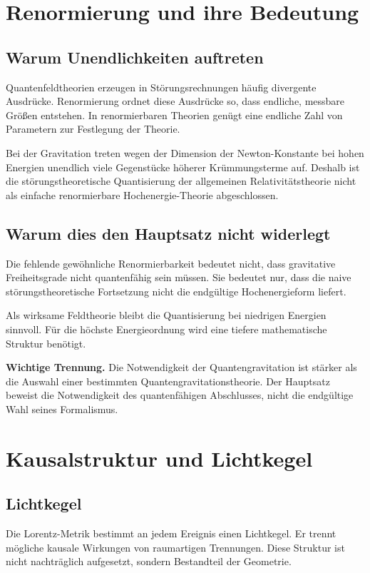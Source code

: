 \documentclass[11pt,a4paper,openany]{book}
\theoremstyle{remark}
\begin{document}
\chapter{Renormierung und ihre Bedeutung}
\section{Warum Unendlichkeiten auftreten}
Quantenfeldtheorien erzeugen in Störungsrechnungen häufig divergente Ausdrücke. Renormierung ordnet diese Ausdrücke so, dass endliche, messbare Größen entstehen. In renormierbaren Theorien genügt eine endliche Zahl von Parametern zur Festlegung der Theorie.

Bei der Gravitation treten wegen der Dimension der Newton-Konstante bei hohen Energien unendlich viele Gegenstücke höherer Krümmungsterme auf. Deshalb ist die störungstheoretische Quantisierung der allgemeinen Relativitätstheorie nicht als einfache renormierbare Hochenergie-Theorie abgeschlossen.

\section{Warum dies den Hauptsatz nicht widerlegt}
Die fehlende gewöhnliche Renormierbarkeit bedeutet nicht, dass gravitative Freiheitsgrade nicht quantenfähig sein müssen. Sie bedeutet nur, dass die naive störungstheoretische Fortsetzung nicht die endgültige Hochenergieform liefert.

Als wirksame Feldtheorie bleibt die Quantisierung bei niedrigen Energien sinnvoll. Für die höchste Energieordnung wird eine tiefere mathematische Struktur benötigt.

\begin{merkkasten}
\textbf{Wichtige Trennung.} Die Notwendigkeit der Quantengravitation ist stärker als die Auswahl einer bestimmten Quantengravitationstheorie. Der Hauptsatz beweist die Notwendigkeit des quantenfähigen Abschlusses, nicht die endgültige Wahl seines Formalismus.
\end{merkkasten}

\chapter{Kausalstruktur und Lichtkegel}
\section{Lichtkegel}
Die Lorentz-Metrik bestimmt an jedem Ereignis einen Lichtkegel. Er trennt mögliche kausale Wirkungen von raumartigen Trennungen. Diese Struktur ist nicht nachträglich aufgesetzt, sondern Bestandteil der Geometrie.
\end{document}
